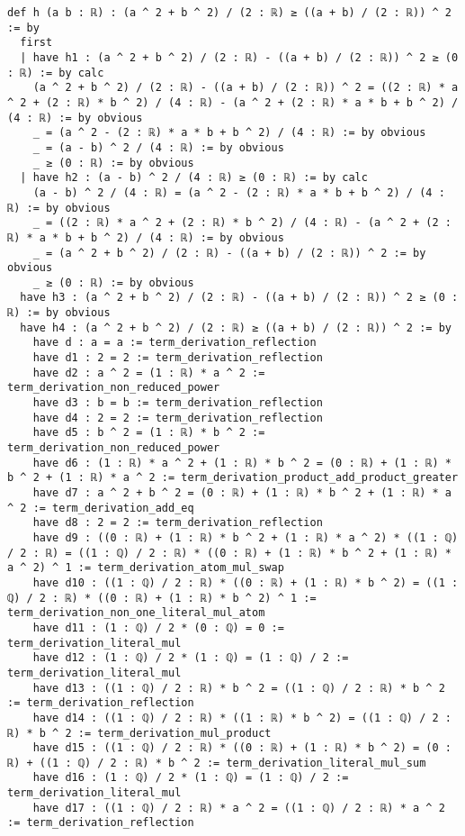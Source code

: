 \documentclass{article}
\begin{document}
\begin{tcolorbox}[colback=white!10, width=\linewidth]
\begin{lstlisting}[language=Lean4]
def h (a b : ℝ) : (a ^ 2 + b ^ 2) / (2 : ℝ) ≥ ((a + b) / (2 : ℝ)) ^ 2 := by
  first
  | have h1 : (a ^ 2 + b ^ 2) / (2 : ℝ) - ((a + b) / (2 : ℝ)) ^ 2 ≥ (0 : ℝ) := by calc
    (a ^ 2 + b ^ 2) / (2 : ℝ) - ((a + b) / (2 : ℝ)) ^ 2 = ((2 : ℝ) * a ^ 2 + (2 : ℝ) * b ^ 2) / (4 : ℝ) - (a ^ 2 + (2 : ℝ) * a * b + b ^ 2) / (4 : ℝ) := by obvious
    _ = (a ^ 2 - (2 : ℝ) * a * b + b ^ 2) / (4 : ℝ) := by obvious
    _ = (a - b) ^ 2 / (4 : ℝ) := by obvious
    _ ≥ (0 : ℝ) := by obvious
  | have h2 : (a - b) ^ 2 / (4 : ℝ) ≥ (0 : ℝ) := by calc
    (a - b) ^ 2 / (4 : ℝ) = (a ^ 2 - (2 : ℝ) * a * b + b ^ 2) / (4 : ℝ) := by obvious
    _ = ((2 : ℝ) * a ^ 2 + (2 : ℝ) * b ^ 2) / (4 : ℝ) - (a ^ 2 + (2 : ℝ) * a * b + b ^ 2) / (4 : ℝ) := by obvious
    _ = (a ^ 2 + b ^ 2) / (2 : ℝ) - ((a + b) / (2 : ℝ)) ^ 2 := by obvious
    _ ≥ (0 : ℝ) := by obvious
  have h3 : (a ^ 2 + b ^ 2) / (2 : ℝ) - ((a + b) / (2 : ℝ)) ^ 2 ≥ (0 : ℝ) := by obvious
  have h4 : (a ^ 2 + b ^ 2) / (2 : ℝ) ≥ ((a + b) / (2 : ℝ)) ^ 2 := by
    have d : a = a := term_derivation_reflection
    have d1 : 2 = 2 := term_derivation_reflection
    have d2 : a ^ 2 = (1 : ℝ) * a ^ 2 := term_derivation_non_reduced_power
    have d3 : b = b := term_derivation_reflection
    have d4 : 2 = 2 := term_derivation_reflection
    have d5 : b ^ 2 = (1 : ℝ) * b ^ 2 := term_derivation_non_reduced_power
    have d6 : (1 : ℝ) * a ^ 2 + (1 : ℝ) * b ^ 2 = (0 : ℝ) + (1 : ℝ) * b ^ 2 + (1 : ℝ) * a ^ 2 := term_derivation_product_add_product_greater
    have d7 : a ^ 2 + b ^ 2 = (0 : ℝ) + (1 : ℝ) * b ^ 2 + (1 : ℝ) * a ^ 2 := term_derivation_add_eq
    have d8 : 2 = 2 := term_derivation_reflection
    have d9 : ((0 : ℝ) + (1 : ℝ) * b ^ 2 + (1 : ℝ) * a ^ 2) * ((1 : ℚ) / 2 : ℝ) = ((1 : ℚ) / 2 : ℝ) * ((0 : ℝ) + (1 : ℝ) * b ^ 2 + (1 : ℝ) * a ^ 2) ^ 1 := term_derivation_atom_mul_swap
    have d10 : ((1 : ℚ) / 2 : ℝ) * ((0 : ℝ) + (1 : ℝ) * b ^ 2) = ((1 : ℚ) / 2 : ℝ) * ((0 : ℝ) + (1 : ℝ) * b ^ 2) ^ 1 := term_derivation_non_one_literal_mul_atom
    have d11 : (1 : ℚ) / 2 * (0 : ℚ) = 0 := term_derivation_literal_mul
    have d12 : (1 : ℚ) / 2 * (1 : ℚ) = (1 : ℚ) / 2 := term_derivation_literal_mul
    have d13 : ((1 : ℚ) / 2 : ℝ) * b ^ 2 = ((1 : ℚ) / 2 : ℝ) * b ^ 2 := term_derivation_reflection
    have d14 : ((1 : ℚ) / 2 : ℝ) * ((1 : ℝ) * b ^ 2) = ((1 : ℚ) / 2 : ℝ) * b ^ 2 := term_derivation_mul_product
    have d15 : ((1 : ℚ) / 2 : ℝ) * ((0 : ℝ) + (1 : ℝ) * b ^ 2) = (0 : ℝ) + ((1 : ℚ) / 2 : ℝ) * b ^ 2 := term_derivation_literal_mul_sum
    have d16 : (1 : ℚ) / 2 * (1 : ℚ) = (1 : ℚ) / 2 := term_derivation_literal_mul
    have d17 : ((1 : ℚ) / 2 : ℝ) * a ^ 2 = ((1 : ℚ) / 2 : ℝ) * a ^ 2 := term_derivation_reflection

\end{lstlisting}
\end{tcolorbox}
\end{document}
